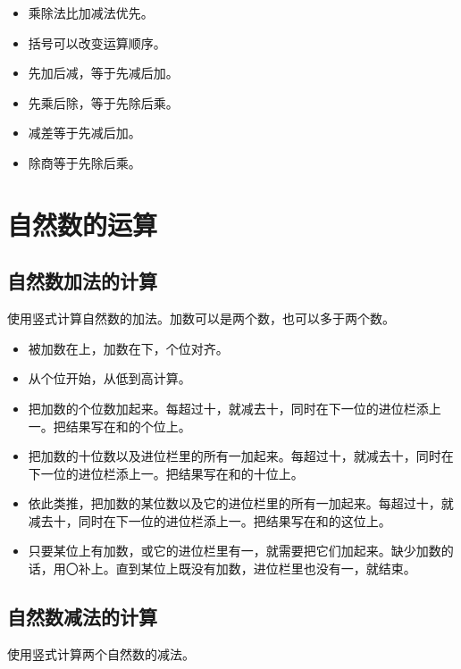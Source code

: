 \documentclass[12pt,UTF8]{ctexbook}
\begin{document}
\begin{itemize}
\item 乘除法比加减法优先。
\item 括号可以改变运算顺序。
\item 先加后减，等于先减后加。
\item 先乘后除，等于先除后乘。
\item 减差等于先减后加。
\item 除商等于先除后乘。
\end{itemize}

\section{自然数的运算}

\subsection{自然数加法的计算}

使用竖式计算自然数的加法。加数可以是两个数，也可以多于两个数。

\begin{itemize}
\item 被加数在上，加数在下，个位对齐。
\item 从个位开始，从低到高计算。
\item 把加数的个位数加起来。每超过十，就减去十，同时在下一位的进位栏添上一。把结果写在和的个位上。
\item 把加数的十位数以及进位栏里的所有一加起来。每超过十，就减去十，同时在下一位的进位栏添上一。把结果写在和的十位上。
\item 依此类推，把加数的某位数以及它的进位栏里的所有一加起来。每超过十，就减去十，同时在下一位的进位栏添上一。把结果写在和的这位上。
\item 只要某位上有加数，或它的进位栏里有一，就需要把它们加起来。缺少加数的话，用〇补上。直到某位上既没有加数，进位栏里也没有一，就结束。
\end{itemize}

\subsection{自然数减法的计算}

使用竖式计算两个自然数的减法。
\end{document}

